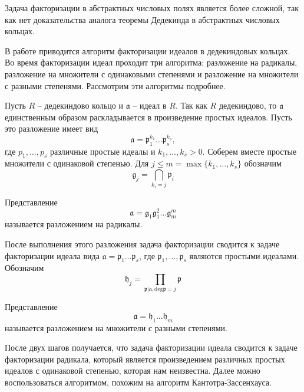 \documentclass[_00_dissertation.tex]{subfiles}
\begin{document}
\begin{remark}
    Задача факторизации в абстрактных числовых полях является более сложной, так как нет доказательства аналога теоремы Дедекинда в абстрактных числовых кольцах.
\end{remark}

В работе \cite{Darkey-Mensah} приводится алгоритм факторизации идеалов в дедекиндовых кольцах.
Во время факторизации идеал проходит три алгоритма: разложение на радикалы, разложение на множители с одинаковыми степенями и разложение на множители с разными степенями.
Рассмотрим эти алгоритмы подробнее.

Пусть $R$ -- дедекиндово кольцо и $\mathfrak{a}$ -- идеал в $R$.
Так как $R$ дедекиндово, то $\mathfrak{a}$ единственным образом раскладывается в произведение простых идеалов.
Пусть это разложение имеет вид
\begin{equation*}
    \mathfrak{a} = \mathfrak{p}_1^{k_1} \dots \mathfrak{p}_s^{k_s},
\end{equation*}
где $p_1, \dots, p_s$ различные простые идеалы и $k_1, \dots, k_s > 0$.
Соберем вместе простые множители с одинаковой степенью.
Для $j \le m = \max\{k_1, \dots, k_s\}$ обозначим
\begin{equation*}
    \mathfrak{g}_j = \bigcap\limits_{k_i = j} \mathfrak{p}_i
\end{equation*}

Представление
\begin{equation*}
    \mathfrak{a} = \mathfrak{g}_1 \mathfrak{g}_1^2 \dots \mathfrak{g}_m^m
\end{equation*}
называется разложением на радикалы.

После выполнения этого разложения задача факторизации сводится к задаче факторизации идеала вида $\mathfrak{a} = \mathfrak{p}_1\dots\mathfrak{p}_s$, где $\mathfrak{p}_1, \dots, \mathfrak{p}_s$ являются простыми идеалами.
Обозначим
\begin{equation*}
    \mathfrak{h}_j = \prod\limits_{\mathfrak{p} | \mathfrak{a}, \textrm{deg} \mathfrak{p} = j} \mathfrak{p}
\end{equation*}

Представление
\begin{equation*}
    \mathfrak{a} = \mathfrak{h}_1 \dots \mathfrak{h}_m
\end{equation*}
называется разложением на множители с разными степенями.

После двух шагов получается, что задача факторизации идеала сводится к задаче факторизации радикала, который является произведением различных простых идеалов с одинаковой степенью, которая нам неизвестна.
Далее можно воспользоваться алгоритмом, похожим на алгоритм Кантотра-Зассенхауса.
\end{document}
